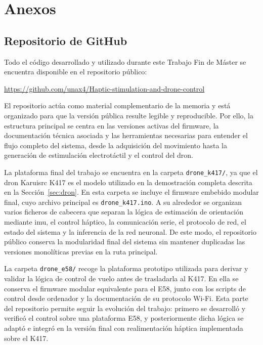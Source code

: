 \documentclass[12pt]{article}
\begin{document}
\newpage



\newpage
{}
\section*{Anexos}



\begin{appendices}

\section{Repositorio de GitHub}
\label{Anexo:A}

Todo el código desarrollado y utilizado durante este Trabajo Fin de Máster se encuentra disponible en el repositorio público:

\begin{center}
\url{https://github.com/unax4/Haptic-stimulation-and-drone-control}
\end{center}

El repositorio actúa como material complementario de la memoria y está organizado para que la versión pública resulte legible y reproducible. Por ello, la estructura principal se centra en las versiones activas del firmware, la documentación técnica asociada y las herramientas necesarias para entender el flujo completo del sistema, desde la adquisición del movimiento hasta la generación de estimulación electrotáctil y el control del dron.

La plataforma final del trabajo se encuentra en la carpeta \texttt{drone\_k417/}, ya que el dron Karuisrc K417 es el modelo utilizado en la demostración completa descrita en la Sección~\ref{sec:dron}. En esta carpeta se incluye el firmware embebido modular final, cuyo archivo principal es \texttt{drone\_k417.ino}. A su alrededor se organizan varios ficheros de cabecera que separan la lógica de estimación de orientación mediante \gls{imu}, el control háptico, la comunicación serie, el protocolo de red, el estado del sistema y la inferencia de la red neuronal. De este modo, el repositorio público conserva la modularidad final del sistema sin mantener duplicadas las versiones monolíticas previas en la ruta principal.

La carpeta \texttt{drone\_e58/} recoge la plataforma prototipo utilizada para derivar y validar la lógica de control de vuelo antes de trasladarla al K417. En ella se conserva el firmware modular equivalente para el E58, junto con los scripts de control desde ordenador y la documentación de su protocolo Wi-Fi. Esta parte del repositorio permite seguir la evolución del trabajo: primero se desarrolló y verificó el control sobre una plataforma E58, y posteriormente dicha lógica se adaptó e integró en la versión final con realimentación háptica implementada sobre el K417.


\end{appendices}
\end{document}
